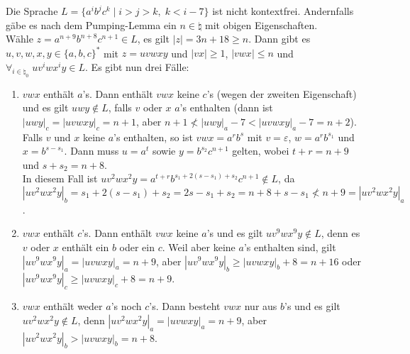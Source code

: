 \begin{Bsp}
    Die Sprache $L = \{a^i b^j c^k \;|\; i > j > k,\; k < i - 7\}$ ist nicht
    kontextfrei.
    Andernfalls gäbe es nach dem Pumping-Lemma ein $n \in \natural$ mit
    obigen Eigenschaften.\\
    Wähle $z = a^{n+9} b^{n+8} c^{n+1} \in L$,
    es gilt $|z| = 3n + 18 \ge n$.
    Dann gibt es $u, v, w, x, y \in \{a, b, c\}^\ast$ mit $z = uvwxy$ und
    $|vx| \ge 1$, $|vwx| \le n$ und
    $\forall_{i \in \natural_0}\; uv^iwx^iy \in L$.
    Es gibt nun drei Fälle:
    \begin{enumerate}
        \item
        $vwx$ enthält $a$'s.
        Dann enthält $vwx$ keine $c$'s (wegen der zweiten Eigenschaft) und
        es gilt $uwy \notin L$, falls $v$ oder $x$ $a$'s enthalten
        (dann ist $|uwy|_c = |uvwxy|_c = n + 1$, aber
        $n + 1 \not< |uwy|_a - 7 < |uvwxy|_a - 7 = n + 2$).\\
        Falls $v$ und $x$ keine $a$'s enthalten, so ist
        $vwx = a^r b^s$ mit $v = \varepsilon$, $w = a^r b^{s_1}$ und
        $x = b^{s - s_1}$.
        Dann muss $u = a^t$ sowie $y = b^{s_2} c^{n+1}$ gelten, wobei
        $t + r = n + 9$ und $s + s_2 = n + 8$.\\
        In diesem Fall ist $uv^2 wx^2 y =
        a^{t+r} b^{s_1 + 2(s - s_1) + s_2} c^{n+1} \notin L$, da\\
        $|uv^2 wx^2 y|_b = s_1 + 2(s - s_1) + s_2 = 2s - s_1 + s_2 =
        n + 8 + s - s_1 \not< n + 9 = |uv^2 wx^2 y|_a$.
        
        \item
        $vwx$ enthält $c$'s.
        Dann enthält $vwx$ keine $a$'s und es gilt
        $uv^9 wx^9 y \notin L$, denn es $v$ oder $x$ enthält ein $b$ oder
        ein $c$.
        Weil aber keine $a$'s enthalten sind, gilt
        $|uv^9 wx^9 y|_a = |uvwxy|_a = n + 9$, aber
        $|uv^9 wx^9 y|_b \ge |uvwxy|_b + 8 = n + 16$ oder
        $|uv^9 wx^9 y|_c \ge |uvwxy|_c + 8 = n + 9$.
        
        \item
        $vwx$ enthält weder $a$'s noch $c$'s.
        Dann besteht $vwx$ nur aus $b$'s und es gilt
        $uv^2 wx^2 y \notin L$, denn $|uv^2 wx^2 y|_a = |uvwxy|_a = n + 9$,
        aber $|uv^2 wx^2 y|_b > |uvwxy|_b = n + 8$.
    \end{enumerate}
\end{Bsp}

\linie
\pagebreak

